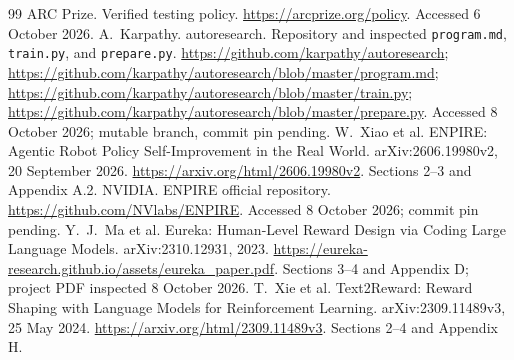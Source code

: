 \documentclass[11pt]{article}
\begin{document}
\begin{thebibliography}{99}
 ARC Prize. Verified testing policy.
\url{https://arcprize.org/policy}. Accessed 6 October 2026.
 A.~Karpathy. autoresearch. Repository and inspected
\texttt{program.md}, \texttt{train.py}, and \texttt{prepare.py}.
\url{https://github.com/karpathy/autoresearch};
\url{https://github.com/karpathy/autoresearch/blob/master/program.md};
\url{https://github.com/karpathy/autoresearch/blob/master/train.py};
\url{https://github.com/karpathy/autoresearch/blob/master/prepare.py}.
Accessed 8 October 2026; mutable branch, commit pin pending.
 W.~Xiao et al. ENPIRE: Agentic Robot Policy Self-Improvement
in the Real World. arXiv:2606.19980v2, 20 September 2026.
\url{https://arxiv.org/html/2606.19980v2}. Sections 2--3 and Appendix A.2.
 NVIDIA. ENPIRE official repository.
\url{https://github.com/NVlabs/ENPIRE}. Accessed 8 October 2026; commit pin pending.
 Y.~J.~Ma et al. Eureka: Human-Level Reward Design via Coding
Large Language Models. arXiv:2310.12931, 2023.
\url{https://eureka-research.github.io/assets/eureka_paper.pdf}.
Sections 3--4 and Appendix D; project PDF inspected 8 October 2026.
 T.~Xie et al. Text2Reward: Reward Shaping with Language
Models for Reinforcement Learning. arXiv:2309.11489v3, 25 May 2024.
\url{https://arxiv.org/html/2309.11489v3}. Sections 2--4 and Appendix H.

\end{thebibliography}
\end{document}
